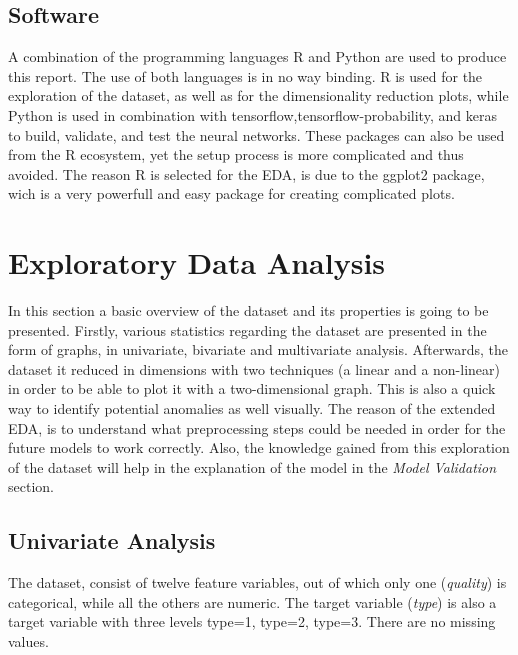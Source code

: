 \documentclass[11pt,twoside]{article}
\numberwithin{Theorem}{section}
\numberwithin{Definition}{section}
\numberwithin{Lemma}{section}
\numberwithin{Algorithm}{section}
\numberwithin{equation}{section}
\begin{document}
\subsection{Software}
\label{sec:software}
A combination of the programming languages \textsf{R} and \textsf{Python} are used to produce this report. The use of both languages is in no way binding. \textsf{R} is used for the exploration of the dataset, as well as for the dimensionality reduction plots, while \textsf{Python} is used in combination with \textsf{tensorflow},\textsf{tensorflow-probability}, and \textsf{keras} to build, validate, and test the neural networks. These packages can also be used from the \textsf{R} ecosystem, yet the setup process is more complicated and thus avoided. The reason \textsf{R} is selected for the EDA, is due to the \textsf{ggplot2} package, wich is a very powerfull and easy package for creating complicated plots.
\clearpage


\section{Exploratory Data Analysis}
In this section a basic overview of the dataset and its properties is going to be presented. Firstly, various statistics regarding the dataset are presented in the form of graphs, in univariate, bivariate and multivariate analysis. Afterwards, the dataset it reduced in dimensions with two techniques (a linear and a non-linear) in order to be able to plot it with a two-dimensional graph. This is also a quick way to identify potential anomalies as well visually. The reason of the extended EDA, is to understand what preprocessing steps could be needed in order for the future models to work correctly. Also, the knowledge gained from this exploration of the dataset will help in the explanation of the model in the \textit{Model Validation} section. 

\subsection{Univariate Analysis}
\label{sec:univariate}
The dataset, consist of twelve feature variables, out of which only one (\textit{quality}) is categorical, while all the others are numeric. The target variable (\textit{type}) is also a target variable with three levels \textsf{type=1, type=2, type=3}. There are no missing values.
\end{document}
